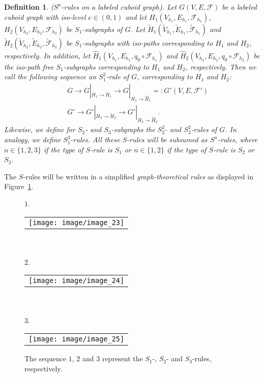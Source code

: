 \documentclass[a4paper,11pt]{article}
\newtheorem{definition}[theorem]{Definition}
\begin{document}
\begin{definition}($S^n$-rules on a labeled cuboid graph). Let $G(V,E,\mathcal{F})$ be a labeled
cuboid graph with iso-level $c\in (0,1)$ and let $H_1(V_{h_1},E_{h_1},\mathcal{F}_{h_1})$,
$H_2(V_{h_2},E_{h_2},\mathcal{F}_{h_2})$ be $S_1$-subgraphs of $G$.
Let $\tilde{H}_1(\tilde{V}_{h_1},\tilde{E}_{h_1},\tilde{\mathcal{F}}_{h_1})$ and
$\tilde{H}_2(\tilde{V}_{h_2},\tilde{E}_{h_2},\tilde{\mathcal{F}}_{h_2})$ be $S_1$-subgraphs
with iso-paths corresponding to $H_1$ and $H_2$, respectively. In addition, let
$\hat{H}_1(V_{h_1},E_{h_1},q_0\circ\mathcal{F}_{h_1})$ and
$\hat{H}_2(V_{h_2},E_{h_2},q_0\circ\mathcal{F}_{h_2})$ be the iso-path free
$S_1$-subgraphs corresponding to $H_1$ and $H_2$, respectively. Then we call the following sequence an
$S_1^2$-rule of $G$, corresponding to $H_1$ and $H_2$:
\begin{eqnarray*}
&&G\longrightarrow G|_{H_1\rightarrow \tilde{H}_1}\longrightarrow G|_{H_1\rightarrow
\hat{H}_1}=:G'(V,E,\mathcal{F}')\\
&&G'\longrightarrow G'|_{H_2\rightarrow \tilde{H}_2}\longrightarrow G'|_{H_2\rightarrow \hat{H}_2}.
\end{eqnarray*}
Likewise, we define for $S_2$- and $S_3$-subgraphs the $S_2^2$- and $S_3^2$-rules of $G$. In analogy, we define
$S_1^3$-rules. All these $S$-rules will be subsumed as $S^n$-rules, where $n\in\{1,2,3\}$ if the type of $S$-rule
is $S_1$ or $n\in\{1,2\}$ if the type of $S$-rule is $S_2$ or $S_3$.
\label{def:iso-path-21}
\end{definition}
The $S$-rules will be written in a simplified {\it graph-theoretical rules} as displayed in
Figure~\ref{image_23_24_25}.
\begin{figure}[!ht]
$1$.
\begin{tabular}[c]{l}
\texttt{[image: image/image\_23]}
\end{tabular}\\ \\

$2$.
\begin{tabular}[c]{l}
\texttt{[image: image/image\_24]}
\end{tabular}\\ \\

$3$.
\begin{tabular}[c]{l}
\texttt{[image: image/image\_25]}
\end{tabular}
\caption{The sequence $1$, $2$ and $3$ represent the $S_1$-, $S_2$- and $S_3$-rules, respectively.}
\label{image_23_24_25}
\end{figure}
\FloatBarrier
\end{document}
